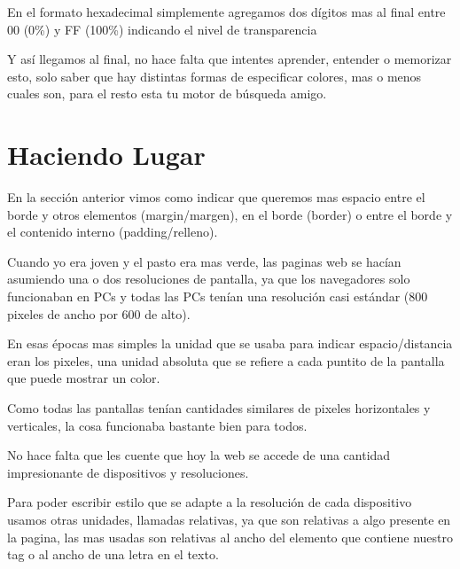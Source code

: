 \documentclass[letterpaper,10pt,spanish]{sphinxmanual}
\begin{document}
En el formato hexadecimal simplemente agregamos dos dígitos mas al final entre
00 (0\%) y FF (100\%) indicando el nivel de transparencia

%
\begin{sphinxVerbatim}[commandchars=\\\{\}]


\end{sphinxVerbatim}

Y así llegamos al final, no hace falta que intentes aprender, entender o
memorizar esto, solo saber que hay distintas formas de especificar colores, mas
o menos cuales son, para el resto esta tu motor de búsqueda amigo.


\chapter{Haciendo Lugar}
\label{\detokenize{haciendo-lugar::doc}}\label{\detokenize{haciendo-lugar:haciendo-lugar}}
En la sección anterior vimos como indicar que queremos mas espacio entre el
borde y otros elementos (margin/margen), en el borde (border) o entre el borde
y el contenido interno (padding/relleno).

Cuando yo era joven y el pasto era mas verde, las paginas web se hacían
asumiendo una o dos resoluciones de pantalla, ya que los navegadores solo
funcionaban en PCs y todas las PCs tenían una resolución casi estándar (800
pixeles de ancho por 600 de alto).

En esas épocas mas simples la unidad que se usaba para indicar
espacio/distancia eran los pixeles, una unidad absoluta que se refiere a cada
puntito de la pantalla que puede mostrar un color.

Como todas las pantallas tenían cantidades similares de pixeles horizontales y
verticales, la cosa funcionaba bastante bien para todos.

No hace falta que les cuente que hoy la web se accede de una cantidad
impresionante de dispositivos y resoluciones.

Para poder escribir estilo que se adapte a la resolución de cada dispositivo
usamos otras unidades, llamadas relativas, ya que son relativas a algo presente
en la pagina, las mas usadas son relativas al ancho del elemento que contiene
nuestro tag o al ancho de una letra en el texto.
\end{document}

